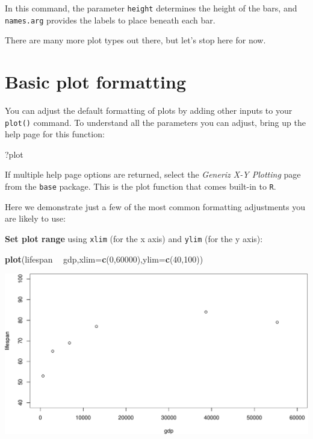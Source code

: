 \documentclass[
]{book}
\newenvironment{Shaded}{\begin{snugshade}}{\end{snugshade}}
\newcommand{\DataTypeTok}[1]{\textcolor[rgb]{0.13,0.29,0.53}{#1}}
\newcommand{\DecValTok}[1]{\textcolor[rgb]{0.00,0.00,0.81}{#1}}
\newcommand{\KeywordTok}[1]{\textcolor[rgb]{0.13,0.29,0.53}{\textbf{#1}}}
\newcommand{\NormalTok}[1]{#1}
\newcommand{\OperatorTok}[1]{\textcolor[rgb]{0.81,0.36,0.00}{\textbf{#1}}}
\newcommand{\StringTok}[1]{\textcolor[rgb]{0.31,0.60,0.02}{#1}}
\begin{document}
In this command, the parameter \texttt{height} determines the height of the bars, and \texttt{names.arg} provides the labels to place beneath each bar.

There are many more plot types out there, but let's stop here for now.

\hypertarget{basic-plot-formatting}{%
\section*{Basic plot formatting}\label{basic-plot-formatting}}

You can adjust the default formatting of plots by adding other inputs to your \texttt{plot()} command. To understand all the parameters you can adjust, bring up the help page for this function:

\begin{Shaded}
\begin{Highlighting}[]
\NormalTok{?plot}
\end{Highlighting}
\end{Shaded}

If multiple help page options are returned, select the \emph{Generiz X-Y Plotting} page from the \texttt{base} package. This is the plot function that comes built-in to \texttt{R}.

Here we demonstrate just a few of the most common formatting adjustments you are likely to use:

\textbf{Set plot range} using \texttt{xlim} (for the x axis) and \texttt{ylim} (for the y axis):

\begin{Shaded}
\begin{Highlighting}[]
\KeywordTok{plot}\NormalTok{(lifespan }\OperatorTok{~}\StringTok{ }\NormalTok{gdp,}\DataTypeTok{xlim=}\KeywordTok{c}\NormalTok{(}\DecValTok{0}\NormalTok{,}\DecValTok{60000}\NormalTok{),}\DataTypeTok{ylim=}\KeywordTok{c}\NormalTok{(}\DecValTok{40}\NormalTok{,}\DecValTok{100}\NormalTok{))}
\end{Highlighting}
\end{Shaded}

\includegraphics{figures/unnamed-chunk-226-1.pdf}
\end{document}
